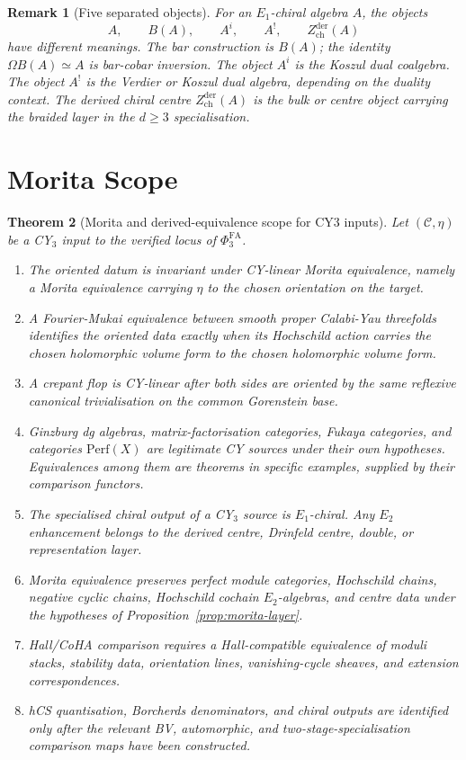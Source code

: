 \documentclass[11pt]{amsart}
\newtheorem{theorem}{Theorem}[section]
\newtheorem{remark}[theorem]{Remark}
\newcommand{\Perf}{\mathrm{Perf}}
\newcommand{\cC}{\mathcal{C}}
\newcommand{\PhiFA}{\Phi^{\mathrm{FA}}}
\newcommand{\Zchder}{Z_{\mathrm{ch}}^{\mathrm{der}}}
\begin{document}
\begin{remark}[Five separated objects]
For an $E_1$-chiral algebra $A$, the objects
\[
  A,\qquad B(A),\qquad A^{i},\qquad A^{!},\qquad \Zchder(A)
\]
have different meanings.  The bar construction is $B(A)$; the identity
$\Omega B(A)\simeq A$ is bar-cobar inversion.  The object $A^{i}$ is the
Koszul dual coalgebra.  The object $A^{!}$ is the Verdier or Koszul dual
algebra, depending on the duality context.  The derived chiral centre
$\Zchder(A)$ is the bulk or centre object carrying the braided layer in
the $d\geq3$ specialisation.
\end{remark}

\section{Morita Scope}

\begin{theorem}[Morita and derived-equivalence scope for CY3 inputs]
\label{thm:morita-derived-scope}
Let $(\cC,\eta)$ be a CY$_3$ input to the verified locus of
$\PhiFA_3$.
\begin{enumerate}
\item The oriented datum is invariant under CY-linear Morita
equivalence, namely a Morita equivalence carrying $\eta$ to the chosen
orientation on the target.
\item A Fourier-Mukai equivalence between smooth proper Calabi-Yau
threefolds identifies the oriented data exactly when its Hochschild
action carries the chosen holomorphic volume form to the chosen
holomorphic volume form.
\item A crepant flop is CY-linear after both sides are oriented by the
same reflexive canonical trivialisation on the common Gorenstein base.
\item Ginzburg dg algebras, matrix-factorisation categories, Fukaya
categories, and categories $\Perf(X)$ are legitimate CY sources under
their own hypotheses.  Equivalences among them are theorems in specific
examples, supplied by their comparison functors.
\item The specialised chiral output of a CY$_3$ source is $E_1$-chiral.
Any $E_2$ enhancement belongs to the derived centre, Drinfeld centre,
double, or representation layer.
\item Morita equivalence preserves perfect module categories,
Hochschild chains, negative cyclic chains, Hochschild cochain
$E_2$-algebras, and centre data under the hypotheses of
Proposition~\ref{prop:morita-layer}.
\item Hall/CoHA comparison requires a Hall-compatible equivalence of
moduli stacks, stability data, orientation lines, vanishing-cycle
sheaves, and extension correspondences.
\item hCS quantisation, Borcherds denominators, and chiral outputs are
identified only after the relevant BV, automorphic, and
two-stage-specialisation comparison maps have been constructed.
\end{enumerate}
\end{theorem}
\end{document}

